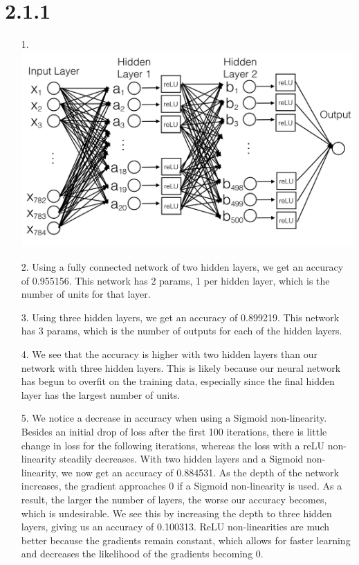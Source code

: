 \documentclass[11pt]{article}
\begin{document}
\section*{2.1.1}
\begin{itemize}
\item[1.] \includegraphics[scale=0.5]{diagrams/nnschematic.png}\\
\item[2.] Using a fully connected network of two hidden layers, we get an accuracy of 0.955156. This network has 2 params, 1 per hidden layer, which is the number of units for that layer. 
\item[3.] Using three hidden layers, we get an accuracy of 0.899219. This network has 3 params, which is the number of outputs for each of the hidden layers. 
\item[4.] We see that the accuracy is higher with two hidden layers than our network with three hidden layers. This is likely because our neural network has begun to overfit on the training data, especially since the final hidden layer has the largest number of units.
\item[5.] We notice a decrease in accuracy when using a Sigmoid non-linearity. Besides an initial drop of loss after the first 100 iterations, there is little change in loss for the following iterations, whereas the loss with a reLU non-linearity steadily decreases. With two hidden layers and a Sigmoid non-linearity, we now get an accuracy of 0.884531. As the depth of the network increases, the gradient approaches 0 if a Sigmoid non-linearity is used. As a result, the larger the number of layers, the worse our accuracy becomes, which is undesirable. We see this by increasing the depth to three hidden layers, giving us an accuracy of 0.100313. ReLU non-linearities are much better because the gradients remain constant, which allows for faster learning and decreases the likelihood of the gradients becoming 0.

\end{itemize}
\newpage
\end{document}
